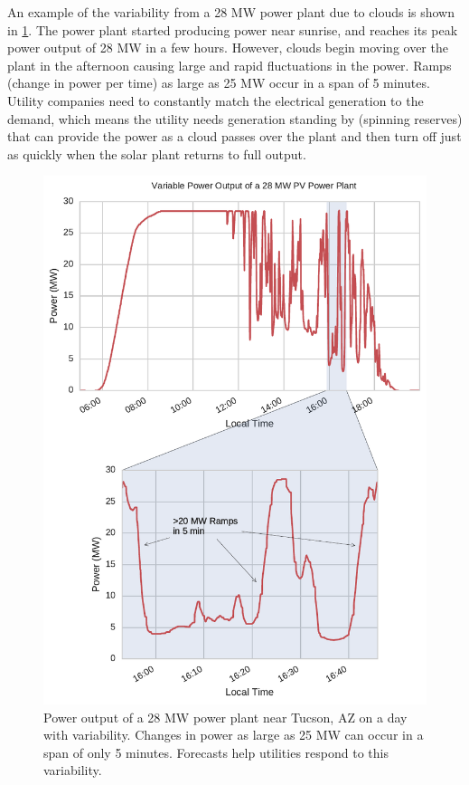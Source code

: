 An example of the variability from a 28 MW power plant due to clouds
is shown in \cref{fig:variability_example}.
The power plant started producing power near sunrise, and reaches its
peak power output of 28 MW in a few hours.
However, clouds begin moving over the plant in the afternoon causing
large and rapid fluctuations in the power.
Ramps (change in power per time) as large as 25 MW occur in a span of
5 minutes.
Utility companies need to constantly match the electrical generation
to the demand, which means the utility needs generation standing by
(spinning reserves) that can provide the power as a cloud passes over
the plant and then turn off just as quickly when the solar plant
returns to full output.


\begin{figure}[htbp]
\centering
\includegraphics[width=.9\textwidth]{figs/avalon_ramps.pdf}
\caption[Variable power output of a 28 MW solar power plant]{
Power output of a 28 MW power plant near Tucson, AZ on a day with
variability. Changes in power as large as 25 MW can occur in a span of
only 5 minutes. Forecasts help utilities respond to this variability.}
\label{fig:variability_example}
\end{figure}

